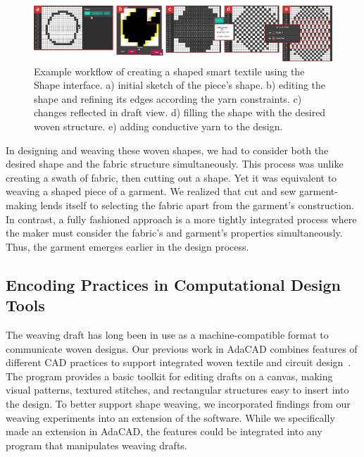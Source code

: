 \begin{figure}[t!]
    \centering
    \includegraphics[width=\linewidth]{figs/UF_workflow.png}
    \caption[Example workflow for creating a shaped, disassemble-able woven smart textile.]{Example workflow of creating a shaped smart textile using the Shape interface. a) initial sketch of the piece's shape. b) editing the shape and refining its edges according the yarn constraints. c) changes reflected in draft view. d) filling the shape with the desired woven structure. e) adding conductive yarn to the design.}
    \label{fig:draftDesign}
\end{figure}

In designing and weaving these woven shapes, we had to consider both the desired shape and the fabric structure simultaneously. This process was unlike creating a swath of fabric, then cutting out a shape. Yet it was equivalent to weaving a shaped piece of a garment. We realized that cut and sew garment-making lends itself to selecting the fabric apart from the garment's construction. In contrast, a fully fashioned approach is a more tightly integrated process where the maker must consider the fabric's and garment's properties simultaneously. Thus, the garment emerges earlier in the design process.

\subsection{Encoding Practices in Computational Design Tools}

The weaving draft has long been in use as a machine-compatible format to communicate woven designs. Our previous work in AdaCAD combines features of different CAD practices to support integrated woven textile and circuit design~\cite{friske_adacad:_2019}. The program provides a basic toolkit for editing drafts on a canvas, making visual patterns, textured stitches, and rectangular structures easy to insert into the design. To better support shape weaving, we incorporated findings from our weaving experiments into an extension of the software. While we specifically made an extension in AdaCAD, the features could be integrated into any program that manipulates weaving drafts.

